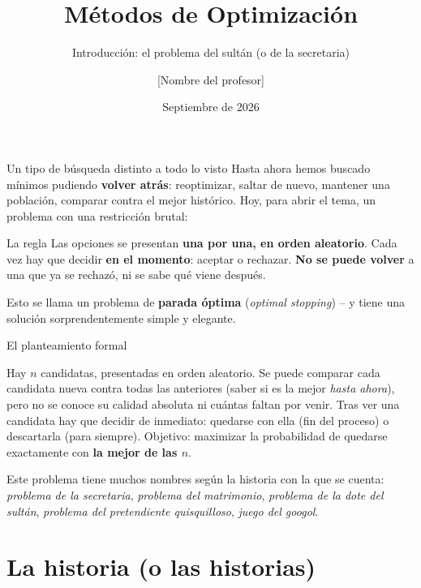 \documentclass[aspectratio=169,10pt]{beamer}
\title{Métodos de Optimización}
\subtitle{Introducción: el problema del sultán (o de la secretaria)}
\author{[Nombre del profesor]}
\institute{Programa de Maestría, [Nombre de la universidad / programa]}
\date{Septiembre de 2026}
\begin{document}
\begin{frame}[plain]
  \maketitle
\end{frame}

\begin{frame}{Un tipo de búsqueda distinto a todo lo visto}
  Hasta ahora hemos buscado mínimos pudiendo \textbf{volver atrás}:
  reoptimizar, saltar de nuevo, mantener una población, comparar contra
  el mejor histórico. Hoy, para abrir el tema, un problema con una
  restricción brutal:
  \begin{alertblock}{La regla}
    Las opciones se presentan \textbf{una por una, en orden aleatorio}.
    Cada vez hay que decidir \textbf{en el momento}: aceptar o
    rechazar. \textbf{No se puede volver} a una que ya se rechazó, ni
    se sabe qué viene después.
  \end{alertblock}
  Esto se llama un problema de \textbf{parada óptima}
  (\emph{optimal stopping}) -- y tiene una solución sorprendentemente
  simple y elegante.
\end{frame}

\begin{frame}{El planteamiento formal}
  \begin{block}{}
    Hay $n$ candidatas, presentadas en orden aleatorio. Se puede
    comparar cada candidata nueva contra todas las anteriores (saber
    si es la mejor \emph{hasta ahora}), pero no se conoce su
    calidad absoluta ni cuántas faltan por venir. Tras ver una
    candidata hay que decidir de inmediato: quedarse con ella (fin
    del proceso) o descartarla (para siempre). Objetivo: maximizar la
    probabilidad de quedarse exactamente con \textbf{la mejor de las
    $n$}.
  \end{block}
  \small Este problema tiene muchos nombres según la historia con la
  que se cuenta: \emph{problema de la secretaria}, \emph{problema del
  matrimonio}, \emph{problema de la dote del sultán},
  \emph{problema del pretendiente quisquilloso}, \emph{juego del
  googol}.
\end{frame}

\section{La historia (o las historias)}
\end{document}
